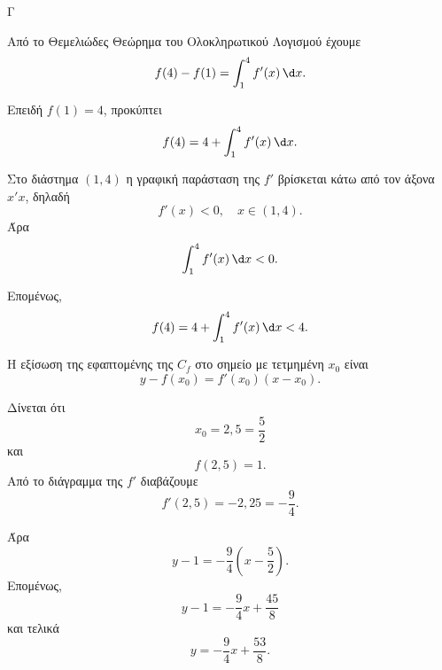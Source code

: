 \begin{thema}{Γ}
\begin{erwthma}
\item Από το Θεμελιώδες Θεώρημα του Ολοκληρωτικού Λογισμού έχουμε
\[
f(4)-f(1)=\int_1^4 f'(x)\,\d x.
\]

Επειδή $f(1)=4$, προκύπτει
\[
f(4)=4+\int_1^4 f'(x)\,\d x.
\]

Στο διάστημα $(1,4)$ η γραφική παράσταση της $f'$ βρίσκεται κάτω από τον άξονα $x'x$, δηλαδή
\[
f'(x)<0,\quad x\in(1,4).
\]
Άρα
\[
\int_1^4 f'(x)\,\d x<0.
\]

Επομένως,
\[
f(4)=4+\int_1^4 f'(x)\,\d x<4.
\]

\item Η εξίσωση της εφαπτομένης της $C_f$ στο σημείο με τετμημένη $x_0$ είναι
\[
y-f(x_0)=f'(x_0)(x-x_0).
\]

Δίνεται ότι
\[
x_0=2{,}5=\frac{5}{2}
\]
και
\[
f(2{,}5)=1.
\]
Από το διάγραμμα της $f'$ διαβάζουμε
\[
f'(2{,}5)=-2{,}25=-\frac{9}{4}.
\]

Άρα
\[
y-1=-\frac{9}{4}\left(x-\frac{5}{2}\right).
\]
Επομένως,
\[
y-1=-\frac{9}{4}x+\frac{45}{8}
\]
και τελικά
\[
y=-\frac{9}{4}x+\frac{53}{8}.
\]
\end{erwthma}
\end{thema}

